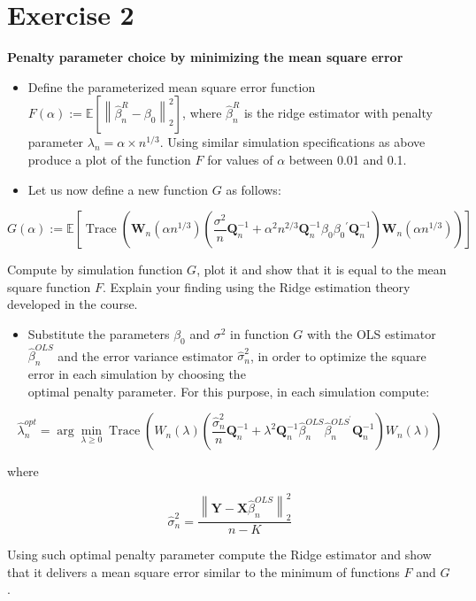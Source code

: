 \section{Exercise 2}
\label{sec:sec2}
\textbf{Penalty parameter choice by minimizing the mean square error}
\begin{itemize}
  \item Define the parameterized mean square error function $F(\alpha):=\mathbb{E}\left[\left\|\hat{\beta}_{n}^{R}-\beta_{0}\right\|_{2}^{2}\right]$, where $\hat{\beta}_{n}^{R}$ is the ridge estimator with penalty parameter $\lambda_{n}=\alpha \times n^{1 / 3}$. Using similar simulation specifications as above produce a plot of the function $F$ for values of $\alpha$ between 0.01 and 0.1.
  \item Let us now define a new function $G$ as follows:
\end{itemize}

$$
G(\alpha):=\mathbb{E}\left[\operatorname{Trace}\left(\boldsymbol{W}_{n}\left(\alpha n^{1 / 3}\right)\left(\frac{\sigma^{2}}{n} \boldsymbol{Q}_{n}^{-1}+\alpha^{2} n^{2 / 3} \boldsymbol{Q}_{n}^{-1} \beta_{0} \beta_{0}{ }^{\prime} \boldsymbol{Q}_{n}^{-1}\right) \boldsymbol{W}_{n}\left(\alpha n^{1 / 3}\right)\right)\right]
$$

Compute by simulation function $G$, plot it and show that it is equal to the mean square function $F$. Explain your finding using the Ridge estimation theory developed in the course.

\begin{itemize}
  \item Substitute the parameters $\beta_{0}$ and $\sigma^{2}$ in function $G$ with the OLS estimator $\hat{\beta}_{n}^{O L S}$ and the error variance estimator $\hat{\sigma}_{n}^{2}$, in order to optimize the square error in each simulation by choosing the\\
optimal penalty parameter. For this purpose, in each simulation compute:
\end{itemize}

$$
\hat{\lambda}_{n}^{o p t}=\arg \min _{\lambda \geq 0} \operatorname{Trace}\left(W_{n}(\lambda)\left(\frac{\hat{\sigma}_{n}^{2}}{n} \boldsymbol{Q}_{n}^{-1}+\lambda^{2} \boldsymbol{Q}_{n}^{-1} \hat{\beta}_{n}^{O L S} \hat{\beta}_{n}^{O L S^{\prime}} \boldsymbol{Q}_{n}^{-1}\right) W_{n}(\lambda)\right)
$$

where

$$
\hat{\sigma}_{n}^{2}=\frac{\left\|\boldsymbol{Y}-\boldsymbol{X} \hat{\beta}_{n}^{O L S}\right\|_{2}^{2}}{n-K}
$$

Using such optimal penalty parameter compute the Ridge estimator and show that it delivers a mean square error similar to the minimum of functions $F$ and $G$.